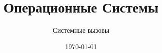 \documentclass[handout,12pt]{beamer}
\title{Операционные Системы}
\subtitle{Системные вызовы}
\date{\today}
\begin{document}
  \begin{frame}
    \titlepage
  \end{frame}
  
\end{document}

